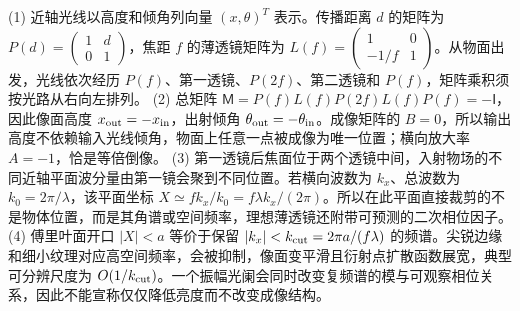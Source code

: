 (1) 近轴光线以高度和倾角列向量 \((x,\theta)^T\) 表示。传播距离 \(d\) 的矩阵为 \(P(d)=\begin{pmatrix}1&d\\0&1\end{pmatrix}\)，焦距 \(f\) 的薄透镜矩阵为 \(L(f)=\begin{pmatrix}1&0\\-1/f&1\end{pmatrix}\)。从物面出发，光线依次经历 \(P(f)\)、第一透镜、\(P(2f)\)、第二透镜和 \(P(f)\)，矩阵乘积须按光路从右向左排列。
(2) 总矩阵 \(\mathsf M=P(f)L(f)P(2f)L(f)P(f)=-\mathsf I\)，因此像面高度 \(x_{\rm out}=-x_{\rm in}\)，出射倾角 \(\theta_{\rm out}=-\theta_{\rm in}\)。成像矩阵的 \(B=0\)，所以输出高度不依赖输入光线倾角，物面上任意一点被成像为唯一位置；横向放大率 \(A=-1\)，恰是等倍倒像。
(3) 第一透镜后焦面位于两个透镜中间，入射物场的不同近轴平面波分量由第一镜会聚到不同位置。若横向波数为 \(k_x\)、总波数为 \(k_0=2\pi/\lambda\)，该平面坐标 \(X\simeq f k_x/k_0=f\lambda k_x/(2\pi)\)。所以在此平面直接裁剪的不是物体位置，而是其角谱或空间频率，理想薄透镜还附带可预测的二次相位因子。
(4) 傅里叶面开口 \(|X|<a\) 等价于保留 \(|k_x|<k_{\rm cut}=2\pi a/(f\lambda)\) 的频谱。尖锐边缘和细小纹理对应高空间频率，会被抑制，像面变平滑且衍射点扩散函数展宽，典型可分辨尺度为 \(O(1/k_{\rm cut})\)。一个振幅光阑会同时改变复频谱的模与可观察相位关系，因此不能宣称仅仅降低亮度而不改变成像结构。
